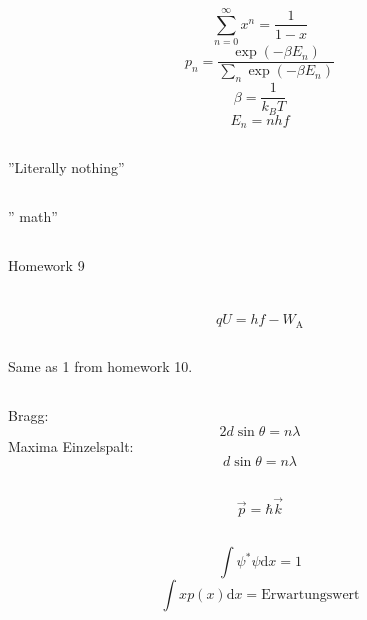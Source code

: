 \documentclass[12pt]{report}
\newcommand{\dd}{\mathrm{d}}
\begin{document}
\section{}

\subsection{}
\[\sum_{n=0}^\infty x^n=\frac{1}{1-x}\]
\[p_n=\frac{\exp(-\beta E_n)}{\sum_n\exp(-\beta E_n)}\]
\[\beta=\frac{1}{k_BT}\]
\[E_n=nhf\]

\subsection{}
''Literally nothing''

\subsection{}
'' math''

\subsection{}
Homework 9

\section{}

\subsection{}
\[qU=hf-W_\mathrm{A}\]

\subsection{}
Same as 1 from homework 10.

\subsection{}
Bragg:
\[2d\sin\theta=n\lambda\]
Maxima Einzelspalt:
\[d\sin\theta=n\lambda\]

\subsection{}
\[\vec{p}=\hbar\vec{k}\]

\subsection{}
\[\int\psi^*\psi\dd x=1\]
\[\int x p(x)\dd x=\textrm{Erwartungswert}\]
\end{document}
